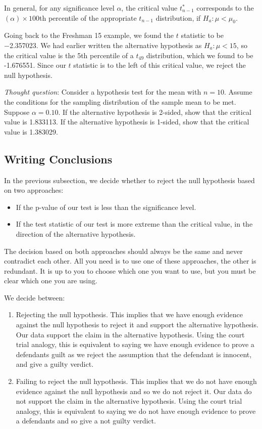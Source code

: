 \documentclass[
]{book}
\providecommand{\tightlist}{%
  \setlength{\itemsep}{0pt}\setlength{\parskip}{0pt}}
\begin{document}
In general, for any significance level \(\alpha\), the critical value \(t_{n-1}^*\) corresponds to the \((\alpha) \times 100\)th percentile of the appropriate \(t_{n-1}\) distribution, if \(H_a: \mu < \mu_0\).

Going back to the Freshman 15 example, we found the \(t\) statistic to be −2.357023. We had earlier written the alternative hypothesis as \(H_a: \mu < 15\), so the critical value is the 5th percentile of a \(t_{49}\) distribution, which we found to be -1.676551. Since our \(t\) statistic is to the left of this critical value, we reject the null hypothesis.

\emph{Thought question}: Consider a hypothesis test for the mean with \(n=10\). Assume the conditions for the sampling distribution of the sample mean to be met. Suppose \(\alpha=0.10\). If the alternative hypothesis is 2-sided, show that the critical value is 1.833113. If the alternative hypothesis is 1-sided, show that the critical value is 1.383029.

\subsection{Writing Conclusions}\label{writing-conclusions}

In the previous subsection, we decide whether to reject the null hypothesis based on two approaches:

\begin{itemize}
\tightlist
\item
  If the p-value of our test is less than the significance level.
\item
  If the test statistic of our test is more extreme than the critical value, in the direction of the alternative hypothesis.
\end{itemize}

The decision based on both approaches should always be the same and never contradict each other. All you need is to use one of these approaches, the other is redundant. It is up to you to choose which one you want to use, but you must be clear which one you are using.

We decide between:

\begin{enumerate}
\def\labelenumi{\arabic{enumi}.}
\item
  Rejecting the null hypothesis. This implies that we have enough evidence against the null hypothesis to reject it and support the alternative hypothesis. Our data support the claim in the alternative hypothesis. Using the court trial analogy, this is equivalent to saying we have enough evidence to prove a defendants guilt as we reject the assumption that the defendant is innocent, and give a guilty verdict.
\item
  Failing to reject the null hypothesis. This implies that we do not have enough evidence against the null hypothesis and so we do not reject it. Our data do not support the claim in the alternative hypothesis. Using the court trial analogy, this is equivalent to saying we do not have enough evidence to prove a defendants and so give a not guilty verdict.
\end{enumerate}
\end{document}
